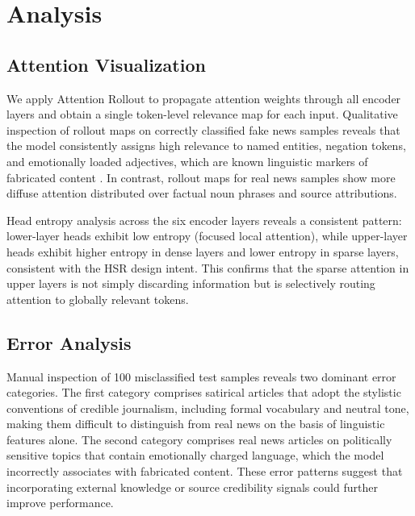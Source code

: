 \documentclass[conference]{IEEEtran}
\begin{document}
\section{Analysis}
\label{sec:analysis}

\subsection{Attention Visualization}

We apply Attention Rollout \cite{abnar2020quantifying} to propagate attention weights through all encoder layers and obtain a single token-level relevance map for each input. Qualitative inspection of rollout maps on correctly classified fake news samples reveals that the model consistently assigns high relevance to named entities, negation tokens, and emotionally loaded adjectives, which are known linguistic markers of fabricated content \cite{potthast2018stylometric}. In contrast, rollout maps for real news samples show more diffuse attention distributed over factual noun phrases and source attributions.

Head entropy analysis across the six encoder layers reveals a consistent pattern: lower-layer heads exhibit low entropy (focused local attention), while upper-layer heads exhibit higher entropy in dense layers and lower entropy in sparse layers, consistent with the HSR design intent. This confirms that the sparse attention in upper layers is not simply discarding information but is selectively routing attention to globally relevant tokens.

\subsection{Error Analysis}

Manual inspection of 100 misclassified test samples reveals two dominant error categories. The first category comprises satirical articles that adopt the stylistic conventions of credible journalism, including formal vocabulary and neutral tone, making them difficult to distinguish from real news on the basis of linguistic features alone. The second category comprises real news articles on politically sensitive topics that contain emotionally charged language, which the model incorrectly associates with fabricated content. These error patterns suggest that incorporating external knowledge or source credibility signals could further improve performance.
\end{document}
